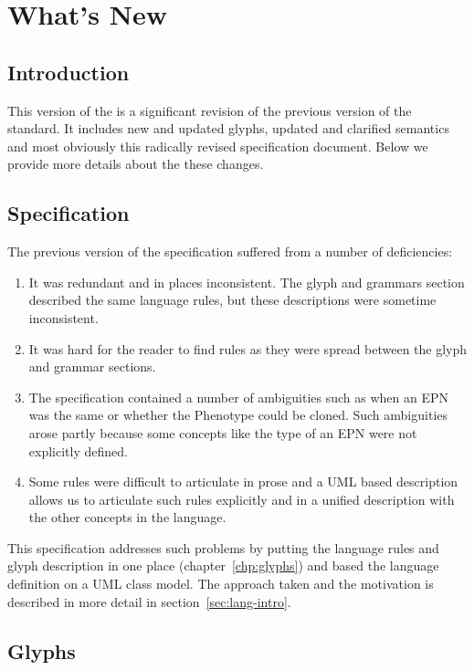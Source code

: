 \chapter{What's New}

\section{Introduction}

This version of the \PDl is a significant revision of the previous version of the standard. It includes new and updated glyphs, updated and clarified semantics and most obviously this radically revised specification document.  Below we provide more details about the these changes.


\section{Specification}

The previous version of the specification suffered from a number of deficiencies:

\begin{enumerate}
\item It was redundant and in places inconsistent. The glyph and grammars section described the same language rules, but these descriptions were sometime inconsistent.
\item It was hard for the reader to find rules as they were spread between the glyph and grammar sections.
\item The specification contained a number of ambiguities such as when an EPN was the same or whether the Phenotype could be cloned. Such ambiguities arose partly because some concepts like the type of an EPN were not explicitly defined.
\item Some rules were difficult to articulate in prose and a UML based description allows us to articulate such rules explicitly and in a unified description with the other concepts in the language.
\end{enumerate}

This specification addresses such problems by putting the language rules and glyph description in one place (chapter~\ref{chp:glyphs}) and based the language definition on a UML class model. The approach taken and the motivation is described in more detail in section~\ref{sec:lang-intro}.

\section{Glyphs}

